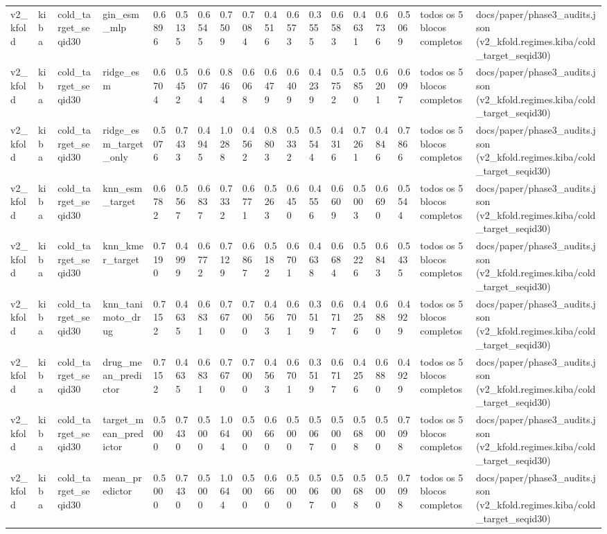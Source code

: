 \begin{table}[htbp]
\begin{tabular}{llllllllllllllllll}
v2\_kfold & kiba & cold\_target\_seqid30 & gin\_esm\_mlp & 0.6896 & 0.5135 & 0.6545 & 0.7509 & 0.7084 & 0.4516 & 0.6573 & 0.3555 & 0.6583 & 0.4631 & 0.6736 & 0.5069 & todos os 5 blocos completos & docs/paper/phase3\_audits.json (v2\_kfold.regimes.kiba/cold\_target\_seqid30) \\
v2\_kfold & kiba & cold\_target\_seqid30 & ridge\_esm & 0.6704 & 0.5452 & 0.6074 & 0.8464 & 0.6068 & 0.6479 & 0.6409 & 0.4239 & 0.5752 & 0.5850 & 0.6201 & 0.6097 & todos os 5 blocos completos & docs/paper/phase3\_audits.json (v2\_kfold.regimes.kiba/cold\_target\_seqid30) \\
v2\_kfold & kiba & cold\_target\_seqid30 & ridge\_esm\_target\_only & 0.5076 & 0.7433 & 0.4945 & 1.0288 & 0.4562 & 0.8803 & 0.5332 & 0.5544 & 0.4316 & 0.7261 & 0.4846 & 0.7866 & todos os 5 blocos completos & docs/paper/phase3\_audits.json (v2\_kfold.regimes.kiba/cold\_target\_seqid30) \\
v2\_kfold & kiba & cold\_target\_seqid30 & knn\_esm\_target & 0.6782 & 0.5567 & 0.6837 & 0.7332 & 0.6771 & 0.5263 & 0.6450 & 0.4556 & 0.6609 & 0.5003 & 0.6690 & 0.5544 & todos os 5 blocos completos & docs/paper/phase3\_audits.json (v2\_kfold.regimes.kiba/cold\_target\_seqid30) \\
v2\_kfold & kiba & cold\_target\_seqid30 & knn\_kmer\_target & 0.7190 & 0.4999 & 0.6772 & 0.7129 & 0.6867 & 0.5182 & 0.6701 & 0.4638 & 0.6684 & 0.5226 & 0.6843 & 0.5435 & todos os 5 blocos completos & docs/paper/phase3\_audits.json (v2\_kfold.regimes.kiba/cold\_target\_seqid30) \\
v2\_kfold & kiba & cold\_target\_seqid30 & knn\_tanimoto\_drug & 0.7152 & 0.4635 & 0.6831 & 0.7670 & 0.7000 & 0.4563 & 0.6701 & 0.3519 & 0.6717 & 0.4256 & 0.6880 & 0.4929 & todos os 5 blocos completos & docs/paper/phase3\_audits.json (v2\_kfold.regimes.kiba/cold\_target\_seqid30) \\
v2\_kfold & kiba & cold\_target\_seqid30 & drug\_mean\_predictor & 0.7152 & 0.4635 & 0.6831 & 0.7670 & 0.7000 & 0.4563 & 0.6701 & 0.3519 & 0.6717 & 0.4256 & 0.6880 & 0.4929 & todos os 5 blocos completos & docs/paper/phase3\_audits.json (v2\_kfold.regimes.kiba/cold\_target\_seqid30) \\
v2\_kfold & kiba & cold\_target\_seqid30 & target\_mean\_predictor & 0.5000 & 0.7430 & 0.5000 & 1.0644 & 0.5000 & 0.6660 & 0.5000 & 0.5067 & 0.5000 & 0.5688 & 0.5000 & 0.7098 & todos os 5 blocos completos & docs/paper/phase3\_audits.json (v2\_kfold.regimes.kiba/cold\_target\_seqid30) \\
v2\_kfold & kiba & cold\_target\_seqid30 & mean\_predictor & 0.5000 & 0.7430 & 0.5000 & 1.0644 & 0.5000 & 0.6660 & 0.5000 & 0.5067 & 0.5000 & 0.5688 & 0.5000 & 0.7098 & todos os 5 blocos completos & docs/paper/phase3\_audits.json (v2\_kfold.regimes.kiba/cold\_target\_seqid30) \\

\end{tabular}
\end{table}
